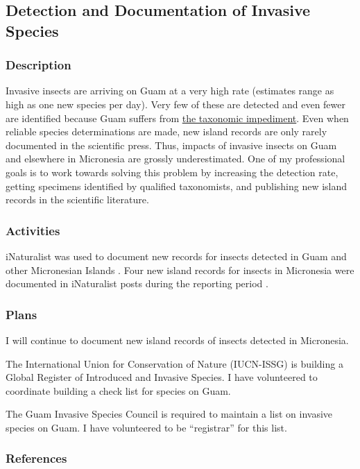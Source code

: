 \subsection{Detection and Documentation of Invasive Species}
\begin{refsection}

\subsubsection{Description}

Invasive insects are arriving on Guam at a very high rate (estimates
range as high as one new species per day). Very few of these are detected
and even fewer are identified because Guam suffers from \href{https://en.wikipedia.org/wiki/Taxonomic_impediment}{the taxonomic impediment}.
Even when reliable species determinations are made, new island records
are only rarely documented in the scientific press. Thus, impacts
of invasive insects on Guam and elsewhere in Micronesia are grossly
underestimated. One of my professional goals is to work towards solving
this problem by increasing the detection rate, getting specimens identified
by qualified taxonomists, and publishing new island records in the
scientific literature.

\subsubsection{Activities}

iNaturalist was used to document new records for insects detected in Guam and other Micronesian Islands \cite{inatSearch20220327}. 
Four new island records for insects in Micronesia were documented in iNaturalist posts during the reporting period \cite{inat108690775, inat103065598, inat57656025, inat48501627}.

\subsubsection{Plans}

I will continue to document new island records of insects detected in Micronesia.

The International Union for Conservation of Nature (IUCN-ISSG) is
building a Global Register of Introduced and Invasive Species. I have
volunteered to coordinate building a check list for species on Guam.

The Guam Invasive Species Council is required to maintain a list on
invasive species on Guam. I have volunteered to be ``registrar''
for this list.

\subsubsection{References}
\printbibliography[heading=none]
\end{refsection}

